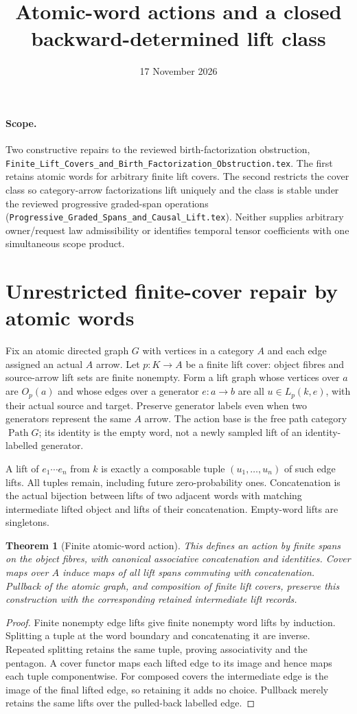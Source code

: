 \documentclass[11pt]{article}
\title{Atomic-word actions and a closed backward-determined lift class}
\date{17 November 2026}
\newtheorem{theorem}{Theorem}\newtheorem{proposition}{Proposition}
\begin{document}
\maketitle
\paragraph{Scope.} Two constructive repairs to the reviewed birth-factorization obstruction, \texttt{Finite\_Lift\_Covers\_and\_Birth\_Factorization\_Obstruction.tex}. The first retains atomic words for arbitrary finite lift covers. The second restricts the cover class so category-arrow factorizations lift uniquely and the class is stable under the reviewed progressive graded-span operations (\texttt{Progressive\_Graded\_Spans\_and\_Causal\_Lift.tex}). Neither supplies arbitrary owner/request law admissibility or identifies temporal tensor coefficients with one simultaneous scope product.

\section{Unrestricted finite-cover repair by atomic words}
Fix an atomic directed graph $G$ with vertices in a category $A$ and each edge assigned an actual $A$ arrow. Let $p:K\to A$ be a finite lift cover: object fibres and source-arrow lift sets are finite nonempty. Form a lift graph whose vertices over $a$ are $O_p(a)$ and whose edges over a generator $e:a\to b$ are all $u\in L_p(k,e)$, with their actual source and target. Preserve generator labels even when two generators represent the same $A$ arrow. The action base is the free path category $\operatorname{Path}G$; its identity is the empty word, not a newly sampled lift of an identity-labelled generator.

A lift of $e_1\cdots e_n$ from $k$ is exactly a composable tuple $(u_1,\ldots,u_n)$ of such edge lifts. All tuples remain, including future zero-probability ones. Concatenation is the actual bijection between lifts of two adjacent words with matching intermediate lifted object and lifts of their concatenation. Empty-word lifts are singletons.

\begin{theorem}[Finite atomic-word action]
This defines an action by finite spans on the object fibres, with canonical associative concatenation and identities. Cover maps over $A$ induce maps of all lift spans commuting with concatenation. Pullback of the atomic graph, and composition of finite lift covers, preserve this construction with the corresponding retained intermediate lift records.
\end{theorem}
\begin{proof}
Finite nonempty edge lifts give finite nonempty word lifts by induction. Splitting a tuple at the word boundary and concatenating it are inverse. Repeated splitting retains the same tuple, proving associativity and the pentagon. A cover functor maps each lifted edge to its image and hence maps each tuple componentwise. For composed covers the intermediate edge is the image of the final lifted edge, so retaining it adds no choice. Pullback merely retains the same lifts over the pulled-back labelled edge.\end{proof}
\end{document}
